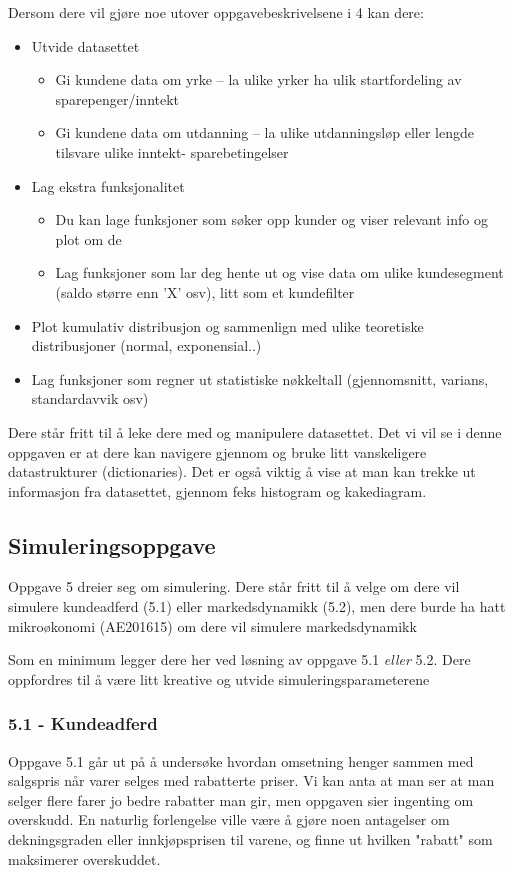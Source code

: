 \documentclass[12pt, titlepage]{article}
\begin{document}
Dersom dere vil gjøre noe utover oppgavebeskrivelsene i 4 kan dere:
\begin{itemize}
   \item{Utvide datasettet}
      \begin{itemize}
         \item{Gi kundene data om yrke -- la ulike yrker ha ulik startfordeling av sparepenger/inntekt}
         \item{Gi kundene data om utdanning -- la ulike utdanningsløp eller lengde tilsvare ulike inntekt- sparebetingelser}
      \end{itemize}
   \item{Lag ekstra funksjonalitet}
      \begin{itemize}
         \item {Du kan lage funksjoner som søker opp kunder og viser relevant info og plot om de}
         \item {Lag funksjoner som lar deg hente ut og vise data om ulike kundesegment (saldo større enn 'X' osv), litt som et kundefilter}
      \end{itemize}
   \item {Plot kumulativ distribusjon og sammenlign med ulike teoretiske distribusjoner (normal, exponensial..)}
   \item {Lag funksjoner som regner ut statistiske nøkkeltall (gjennomsnitt, varians, standardavvik osv)}
\end{itemize}

Dere står fritt til å leke dere med og manipulere datasettet.
Det vi vil se i denne oppgaven er at dere kan navigere gjennom og bruke litt vanskeligere datastrukturer (dictionaries).
Det er også viktig å vise at man kan trekke ut informasjon fra datasettet, gjennom feks histogram og kakediagram.

\subsection*{Simuleringsoppgave}

Oppgave 5 dreier seg om simulering. Dere står fritt til å velge om dere vil simulere kundeadferd (5.1) eller markedsdynamikk (5.2),
men dere burde ha hatt mikroøkonomi (AE201615) om dere vil simulere markedsdynamikk

Som en minimum legger dere her ved løsning av oppgave 5.1 \textit{eller} 5.2.
Dere oppfordres til å være litt kreative og utvide simuleringsparameterene

\subsubsection*{5.1 - Kundeadferd}
Oppgave 5.1 går ut på å undersøke hvordan omsetning henger sammen med salgspris når varer selges med rabatterte priser.
Vi kan anta at man ser at man selger flere farer jo bedre rabatter man gir, men oppgaven sier ingenting om overskudd.
En naturlig forlengelse ville være å gjøre noen antagelser om dekningsgraden eller innkjøpsprisen til varene, og finne ut hvilken "rabatt"
som maksimerer overskuddet.
\end{document}
